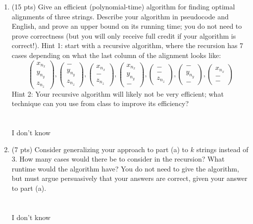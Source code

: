 \documentclass[12pt]{article}
\begin{document}
\begin{enumerate}
\begin{enumerate}
\item (15 pts) Give an efficient (polynomial-time) algorithm for finding optimal alignments of three strings. Describe your algorithm in pseudocode and English, and prove an upper bound on its running time; you do not need to prove correctness (but you will only receive full credit if your algorithm is correct!).
Hint 1: start with a recursive algorithm, where the recursion has 7 cases depending on what the last column of the alignment looks like:
\[
\left(
\begin{array}{c}
x_{n_x} \\
y_{n_y} \\
z_{n_z}
\end{array}
\right), 
\left(
\begin{array}{c}
- \\
y_{n_y} \\
z_{n_z}
\end{array}
\right), 
\left(
\begin{array}{c}
x_{n_x} \\
- \\
z_{n_z}
\end{array}
\right), 
\left(
\begin{array}{c}
x_{n_x} \\
y_{n_y} \\
-
\end{array}
\right), 
\left(
\begin{array}{c}
- \\
- \\
z_{n_z}
\end{array}
\right), 
\left(
\begin{array}{c}
- \\
y_{n_y} \\
-
\end{array}
\right), 
\left(
\begin{array}{c}
x_{n_x} \\
- \\
-
\end{array}
\right)
\]
Hint 2: Your recursive algorithm will likely not be very efficient; what technique can you use from class to improve its efficiency?
\\ \\ \\ I don't know
\pagebreak

\item (7 pts) Consider generalizing your approach to part (a) to $k$ strings instead of 3. How many cases would there be to consider in the recursion? What runtime would the algorithm have? You do not need to give the algorithm, but must argue persuasively that your answers are correct, given your answer to part (a).
\\ \\ \\ I don't know
\pagebreak
\end{enumerate}


\end{enumerate}
\end{document}
